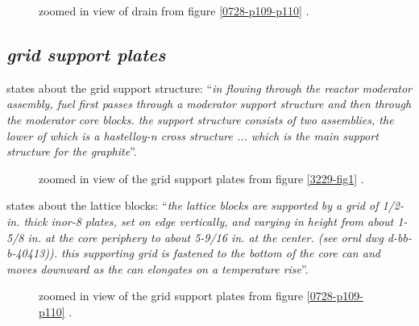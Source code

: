 \documentclass[ms,a4paper]{memoir}
\newcommand*{\mrsarchive}{../../msr-archive}%
\begin{document}
\begin{figure}[H]
  \centering
  \caption{zoomed in view of drain from figure \ref{0728-p109-p110} \parencite[page 110]{ornl-tm-0728}.}
\end{figure}



\subsection{\emph{grid support plates}}
\parencite[page 20]{ornl-tm-3229} states about the grid support structure:
\enquote{\textit{in flowing through the reactor moderator assembly, fuel first passes through a moderator support structure and then through the moderator core blocks. the support structure consists of two assemblies, the lower of which is a hastelloy-n cross structure ... which is the main support structure for the graphite}}.

\begin{figure}[H]
  \centering
  \caption{zoomed in view of the grid support plates from figure \ref{3229-fig1} \parencite[figure 1]{ornl-tm-3229}.}
\end{figure}

\parencite[page 81]{ornl-tm-0728} states about the lattice blocks:
\enquote{\textit{the lattice blocks are supported by a grid of 1/2-in. thick inor-8 plates, set on edge vertically, and varying in height from about 1-5/8 in. at the core periphery to about 5-9/16 in. at the center. (see ornl dwg d-bb-b-40413)). this supporting grid is fastened to the bottom of the core can and moves downward as the can elongates on a temperature rise}}.

\begin{figure}[H]
  \centering
  \caption{zoomed in view of the grid support plates from figure \ref{0728-p109-p110} \parencite[page 110]{ornl-tm-0728}.}
\end{figure}
\end{document}
